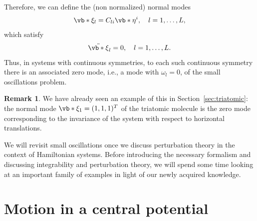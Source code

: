 \documentclass[english,fontsize=11pt,paper=b5]{scrbook}
\theoremstyle{definition}
\newtheorem{remark}{Remark}[chapter]
\begin{document}
    Therefore, we can define the (non normalized) normal modes
    \begin{equation}
      \vb*{\xi}_l = C_{li} \vb*{\eta}^i, \quad l=1,\ldots, L,
    \end{equation}
    which satisfy
    \begin{equation}
      \ddot{\vb*{\xi}}_l = 0, \quad l=1,\ldots, L.
    \end{equation}
    Thus, in systems with continuous symmetries, to each such continuous symmetry there is an associated zero mode, i.e., a mode with $\omega_l = 0$, of the small oscillations problem.

    \begin{remark}
      We have already seen an example of this in Section~\ref{sec:triatomic}: the normal mode $\vb*{\xi}_1=(1,1,1)^T$ of the triatomic molecule is the zero mode corresponding to the invariance of the system with respect to horizontal translations.
    \end{remark}
    \medskip

    We will revisit small oscillations once we discuss perturbation theory in the context of Hamiltonian systems. Before introducing the necessary formalism and discussing integrability and perturbation theory, we will spend some time looking at an important family of examples in light of our newly acquired knowledge.

    \section{Motion in a central potential}
\end{document}
